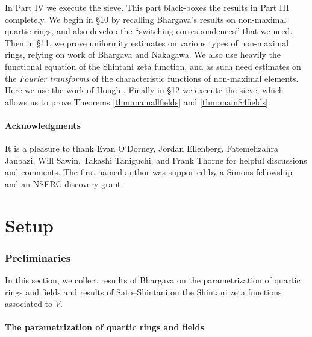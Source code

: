 \documentclass{article}
\begin{document}
In Part IV we execute the sieve. This part black-boxes the results in Part III completely. We begin in \S10 by recalling Bhargava's results on non-maximal quartic rings, and also develop the ``switching correspondences'' that we need. Then in \S11, we prove uniformity estimates on various types of non-maximal rings, relying on work of Bhargava and Nakagawa. We also use heavily the functional equation of the Shintani zeta function, and as such need estimates on the {\it Fourier transforms} of the characteristic functions of non-maximal elements. Here we use the work of Hough \cite{hough}. Finally in \S12 we execute the sieve, which allows us to prove Theorems \ref{thm:mainallfields} and \ref{thm:mainS4fields}. 


\subsection*{Acknowledgments}

It is a pleasure to thank Evan O'Dorney, Jordan Ellenberg, Fatemehzahra Janbazi, Will Sawin, Takashi Taniguchi, and Frank Thorne for helpful discussions and comments. The first-named author was supported by a Simons fellowship and an NSERC discovery grant.


\part{Setup}

\section{Preliminaries}




In this section, we collect resu.lts of Bhargava \cite{BHCL3} on the parametrization of quartic rings and fields and results of Sato--Shintani \cite{SatoShintani} on the Shintani zeta functions associated to $V$. 

\subsection{The parametrization of quartic rings and fields}
\end{document}
